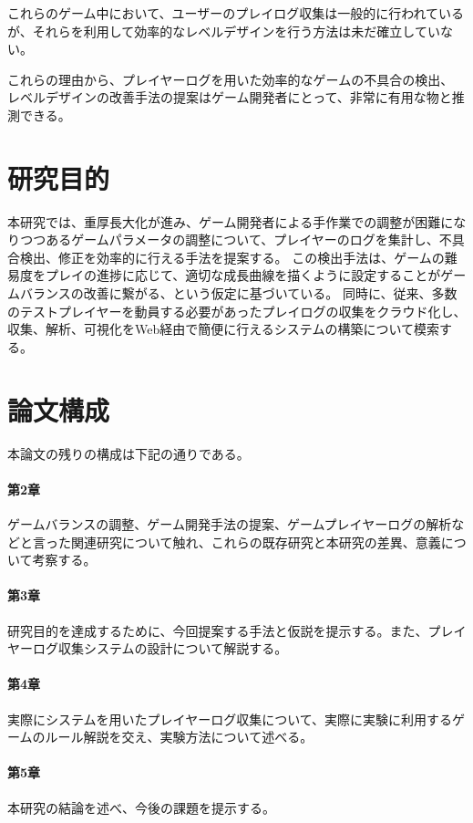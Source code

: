 これらのゲーム中において、ユーザーのプレイログ収集は一般的に行われているが、それらを利用して効率的なレベルデザインを行う方法は未だ確立していない。


これらの理由から、プレイヤーログを用いた効率的なゲームの不具合の検出、 レベルデザインの改善手法の提案はゲーム開発者にとって、非常に有用な物と推測できる。


\section{研究目的}
本研究では、重厚長大化が進み、ゲーム開発者による手作業での調整が困難になりつつあるゲームパラメータの調整について、プレイヤーのログを集計し、不具合検出、修正を効率的に行える手法を提案する。
この検出手法は、ゲームの難易度をプレイの進捗に応じて、適切な成長曲線を描くように設定することがゲームバランスの改善に繋がる、という仮定に基づいている。
同時に、従来、多数のテストプレイヤーを動員する必要があったプレイログの収集をクラウド化し、収集、解析、可視化をWeb経由で簡便に行えるシステムの構築について模索する。

\section{論文構成}
本論文の残りの構成は下記の通りである。
\paragraph{第2章}
ゲームバランスの調整、ゲーム開発手法の提案、ゲームプレイヤーログの解析などと言った関連研究について触れ、これらの既存研究と本研究の差異、意義について考察する。
\paragraph{第3章}
研究目的を達成するために、今回提案する手法と仮説を提示する。また、プレイヤーログ収集システムの設計について解説する。
\paragraph{第4章}
実際にシステムを用いたプレイヤーログ収集について、実際に実験に利用するゲームのルール解説を交え、実験方法について述べる。
\paragraph{第5章}
本研究の結論を述べ、今後の課題を提示する。
